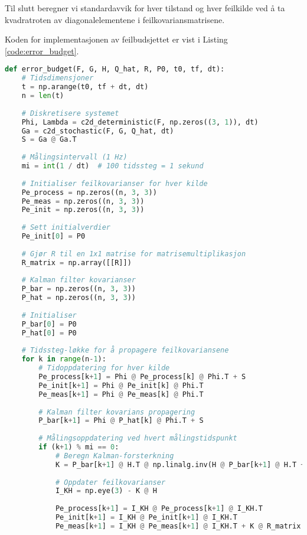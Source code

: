 \documentclass[a4paper,12pt]{article}
\theoremstyle{plain}
\begin{document}
Til slutt beregner vi standardavvik for hver tilstand og hver feilkilde ved å ta kvadratroten av diagonalelementene i feilkovariansmatrisene.

Koden for implementasjonen av feilbudsjettet er vist i Listing \ref{code:error_budget}.

\begin{lstlisting}[language=Python, caption=Implementasjon av feilbudsjett, label=code:error_budget]
def error_budget(F, G, H, Q_hat, R, P0, t0, tf, dt):
    # Tidsdimensjoner
    t = np.arange(t0, tf + dt, dt)
    n = len(t)
    
    # Diskretisere systemet
    Phi, Lambda = c2d_deterministic(F, np.zeros((3, 1)), dt)
    Ga = c2d_stochastic(F, G, Q_hat, dt)
    S = Ga @ Ga.T
    
    # Målingsintervall (1 Hz)
    mi = int(1 / dt)  # 100 tidssteg = 1 sekund
    
    # Initialiser feilkovarianser for hver kilde
    Pe_process = np.zeros((n, 3, 3))
    Pe_meas = np.zeros((n, 3, 3))
    Pe_init = np.zeros((n, 3, 3))
    
    # Sett initialverdier
    Pe_init[0] = P0
    
    # Gjør R til en 1x1 matrise for matrisemultiplikasjon
    R_matrix = np.array([[R]])
    
    # Kalman filter kovarianser
    P_bar = np.zeros((n, 3, 3))
    P_hat = np.zeros((n, 3, 3))
    
    # Initialiser
    P_bar[0] = P0
    P_hat[0] = P0
    
    # Tidssteg-løkke for å propagere feilkovariansene
    for k in range(n-1):
        # Tidoppdatering for hver kilde
        Pe_process[k+1] = Phi @ Pe_process[k] @ Phi.T + S
        Pe_init[k+1] = Phi @ Pe_init[k] @ Phi.T
        Pe_meas[k+1] = Phi @ Pe_meas[k] @ Phi.T
        
        # Kalman filter kovarians propagering
        P_bar[k+1] = Phi @ P_hat[k] @ Phi.T + S
        
        # Målingsoppdatering ved hvert målingstidspunkt
        if (k+1) % mi == 0:
            # Beregn Kalman-forsterkning
            K = P_bar[k+1] @ H.T @ np.linalg.inv(H @ P_bar[k+1] @ H.T + R_matrix)
            
            # Oppdater feilkovarianser
            I_KH = np.eye(3) - K @ H
            
            Pe_process[k+1] = I_KH @ Pe_process[k+1] @ I_KH.T
            Pe_init[k+1] = I_KH @ Pe_init[k+1] @ I_KH.T
            Pe_meas[k+1] = I_KH @ Pe_meas[k+1] @ I_KH.T + K @ R_matrix @ K.T
            

\end{lstlisting}
\end{document}
